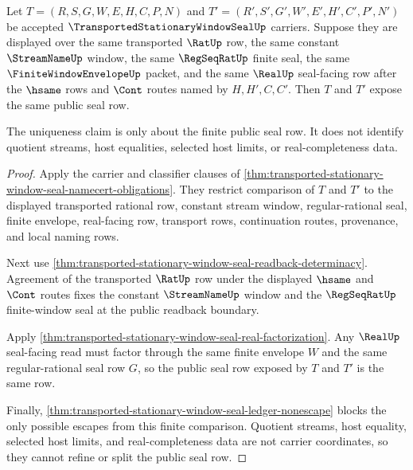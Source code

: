 \begin{theorem}
\label{thm:transported-stationary-window-seal-uniqueness}
Let $T=(R,S,G,W,E,H,C,P,N)$ and $T'=(R',S',G',W',E',H',C',P',N')$ be accepted $\TransportedStationaryWindowSealUp$ carriers. Suppose they are displayed over the same transported $\RatUp$ row, the same constant $\StreamNameUp$ window, the same $\RegSeqRatUp$ finite seal, the same $\FiniteWindowEnvelopeUp$ packet, and the same $\RealUp$ seal-facing row after the $\hsame$ rows and $\Cont$ routes named by $H,H',C,C'$. Then $T$ and $T'$ expose the same public seal row.

The uniqueness claim is only about the finite public seal row. It does not identify quotient streams, host equalities, selected host limits, or real-completeness data.
\end{theorem}
\begin{proof}
Apply the carrier and classifier clauses of \autoref{thm:transported-stationary-window-seal-namecert-obligations}. They restrict comparison of $T$ and $T'$ to the displayed transported rational row, constant stream window, regular-rational seal, finite envelope, real-facing row, transport rows, continuation routes, provenance, and local naming rows.

Next use \autoref{thm:transported-stationary-window-seal-readback-determinacy}. Agreement of the transported $\RatUp$ row under the displayed $\hsame$ and $\Cont$ routes fixes the constant $\StreamNameUp$ window and the $\RegSeqRatUp$ finite-window seal at the public readback boundary.

Apply \autoref{thm:transported-stationary-window-seal-real-factorization}. Any $\RealUp$ seal-facing read must factor through the same finite envelope $W$ and the same regular-rational seal row $G$, so the public seal row exposed by $T$ and $T'$ is the same row.

Finally, \autoref{thm:transported-stationary-window-seal-ledger-nonescape} blocks the only possible escapes from this finite comparison. Quotient streams, host equality, selected host limits, and real-completeness data are not carrier coordinates, so they cannot refine or split the public seal row.
\end{proof}

